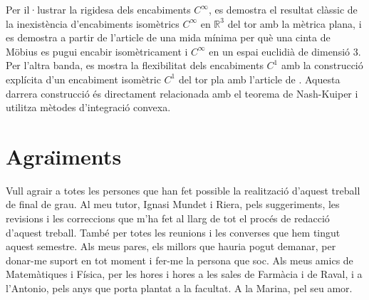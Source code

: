 \documentclass[11pt,a4paper,openright,oneside]{book}
\numberwithin{equation}{section}
\theoremstyle{definition}
\begin{document}
Per il·lustrar la rigidesa dels encabiments $C^\infty$, es demostra el resultat clàssic de la inexistència d'encabiments isomètrics $C^\infty$ en $\mathbb R^3$ del tor amb la mètrica plana, i es demostra a partir de l'article de \citet{schwartz2024} una mida mínima per què una cinta de Möbius es pugui encabir isomètricament i $C^\infty$ en un espai euclidià de dimensió 3. Per l'altra banda, es mostra la flexibilitat dels encabiments $C^1$ amb la construcció explícita d'un encabiment isomètric $C^1$ del tor pla amb l'article de \citet{borrelli2013}. Aquesta darrera construcció és directament relacionada amb el teorema de Nash-Kuiper i utilitza mètodes d'integració convexa.

\newpage 


\section*{Agra\"{\i}ments}
Vull agrair a totes les persones que han fet possible la realització d'aquest treball de final de grau.
Al meu tutor, Ignasi Mundet i Riera, pels suggeriments, les revisions i les correccions que m'ha fet al llarg de tot el procés de redacció d'aquest treball. També per totes les reunions i les converses que hem tingut aquest semestre.
Als meus pares, els millors que hauria pogut demanar, per donar-me suport en tot moment i fer-me la persona que soc.
Als meus amics de Matemàtiques i Física, per les hores i hores a les sales de Farmàcia i de Raval, i a l'Antonio, pels anys que porta plantat a la facultat.
A la Marina, pel seu amor.

\newpage

\tableofcontents

\newpage








%



\normalfont
\end{document}
